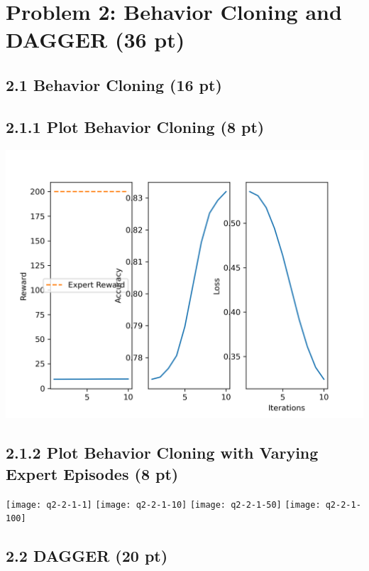 \documentclass[12pt]{article}
\begin{document}
\newpage
\section*{Problem 2: Behavior Cloning and DAGGER (36 pt)}
\subsection*{2.1 Behavior Cloning (16 pt)}

\subsection*{2.1.1 Plot Behavior Cloning (8 pt)}
\begin{tcolorbox}[fit,height=20em, width=40em, blank, borderline={1pt}{1pt},nobeforeafter]
            \begin{center}
            \includegraphics[height= 10cm, width=15.5cm]{q2-1-1}
            \end{center}
            \end{tcolorbox}
            
\subsection*{2.1.2 Plot Behavior Cloning with Varying Expert Episodes (8 pt)}
\texttt{[image: q2-2-1-1]}
\texttt{[image: q2-2-1-10]}
\texttt{[image: q2-2-1-50]}
\texttt{[image: q2-2-1-100]}

\subsection*{2.2 DAGGER (20 pt)}
\end{document}

